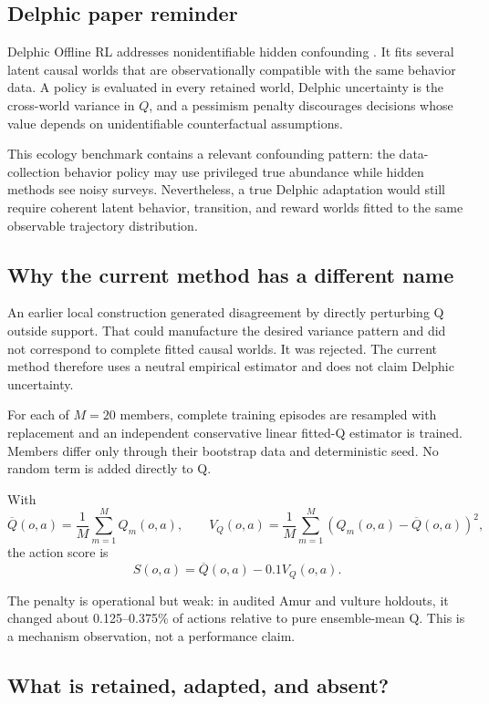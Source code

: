 \documentclass[11pt,a4paper]{article}
\begin{document}
\subsection{Delphic paper reminder}

Delphic Offline RL addresses nonidentifiable hidden confounding
\cite{delphic2024}. It fits several latent causal worlds that are observationally compatible with
the same behavior data. A policy is evaluated in every retained world, Delphic uncertainty is the
cross-world variance in $Q$, and a pessimism penalty discourages decisions whose value depends on
unidentifiable counterfactual assumptions.

This ecology benchmark contains a relevant confounding pattern: the data-collection behavior policy
may use privileged true abundance while hidden methods see noisy surveys. Nevertheless, a true
Delphic adaptation would still require coherent latent behavior, transition, and reward worlds
fitted to the same observable trajectory distribution.

\subsection{Why the current method has a different name}

An earlier local construction generated disagreement by directly perturbing Q outside support.
That could manufacture the desired variance pattern and did not correspond to complete fitted
causal worlds. It was rejected. The current method therefore uses a neutral empirical estimator and
does not claim Delphic uncertainty.

For each of $M=20$ members, complete training episodes are resampled with replacement and an
independent conservative linear fitted-Q estimator is trained. Members differ only through their
bootstrap data and deterministic seed. No random term is added directly to Q.

With
\[
\overline Q(o,a)=\frac{1}{M}\sum_{m=1}^M Q_m(o,a),
\qquad
V_Q(o,a)=\frac{1}{M}\sum_{m=1}^M
\left(Q_m(o,a)-\overline Q(o,a)\right)^2,
\]
the action score is
\[
S(o,a)=\overline Q(o,a)-0.1V_Q(o,a).
\]

The penalty is operational but weak: in audited Amur and vulture holdouts, it changed about
0.125--0.375\% of actions relative to pure ensemble-mean Q. This is a mechanism observation, not a
performance claim.

\subsection{What is retained, adapted, and absent?}
\end{document}
